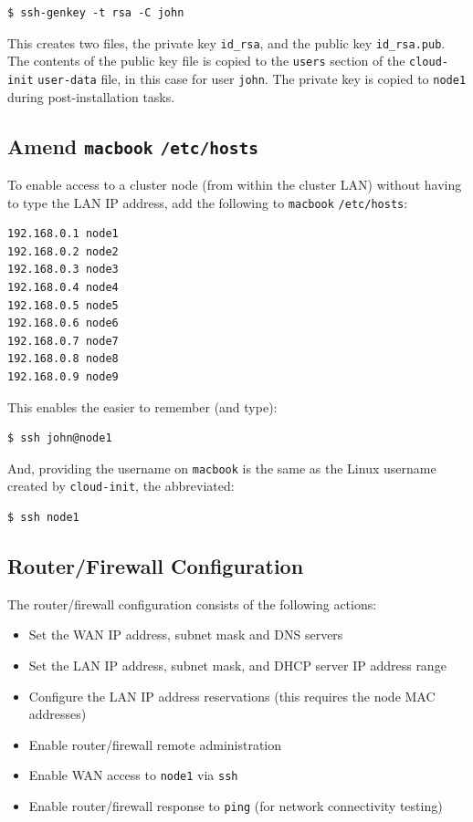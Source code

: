 \documentclass{report}
\begin{document}
\lstset{style=type}
\begin{lstlisting}[]
$ ssh-genkey -t rsa -C john
\end{lstlisting}

This creates two files, the private key \verb|id_rsa|, and the public key \verb|id_rsa.pub|. The contents of the public key file is copied to the \verb|users| section of the \verb|cloud-init| \verb|user-data| file, in this case for user \verb|john|. The private key is copied to \verb|node1| during post-installation tasks.


\subsection{Amend \texttt{macbook} \texttt{/etc/hosts}}

To enable access to a cluster node (from within the cluster LAN) without having to type the LAN IP address, add the following to \verb|macbook| \verb|/etc/hosts|:

\lstset{style=listing}
\begin{lstlisting}[numbers=none, caption=/etc/hosts]
192.168.0.1 node1
192.168.0.2 node2
192.168.0.3 node3
192.168.0.4 node4
192.168.0.5 node5
192.168.0.6 node6
192.168.0.7 node7
192.168.0.8 node8
192.168.0.9 node9
\end{lstlisting}

This enables the easier to remember (and type):

\lstset{style=type}
\begin{lstlisting}[]
$ ssh john@node1
\end{lstlisting}

And, providing the username on \verb|macbook| is the same as the Linux username created by \verb|cloud-init|,
the abbreviated:

\lstset{style=type}
\begin{lstlisting}[]
$ ssh node1
\end{lstlisting}


%
%

\subsection{Router/Firewall Configuration}

The router/firewall configuration consists of the following actions:

\begin{itemize}
  \item Set the WAN IP address, subnet mask and DNS servers
  \item Set the LAN IP address, subnet mask, and DHCP server IP address range
  \item Configure the LAN IP address reservations (this requires the node MAC addresses)
  \item Enable router/firewall remote administration
  \item Enable WAN access to \verb|node1| via \verb|ssh|
  \item Enable router/firewall response to \verb|ping| (for network connectivity testing)
\end{itemize}
\end{document}
